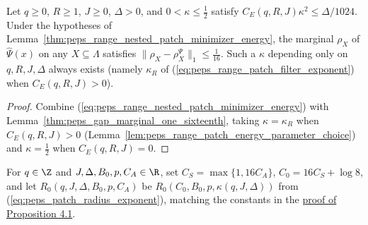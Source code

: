 \begin{lemma}
    \label{thm:peps_range_nested_patch_minimizer_marginal_closeness}
    \leanok
    Let $q\ge0$, $R\ge1$, $J\ge0$, $\Delta>0$, and $0<\kappa\le\tfrac12$ satisfy $C_E(q,R,J)\kappa^2\le\Delta/1024$. Under the hypotheses of Lemma~\ref{thm:peps_range_nested_patch_minimizer_energy}, the marginal $\rho_X$ of $\widehat\Psi(x)$ on any $X\subseteq\Lambda$ satisfies
    $\|\rho_X-\rho_X^{\Psi}\|_1\le\tfrac1{16}$. Such a $\kappa$ depending only on $q,R,J,\Delta$ always exists (namely $\kappa_R$ of (\ref{eq:peps_range_patch_filter_exponent}) when $C_E(q,R,J)>0$).
\end{lemma}
\begin{proof}
    \leanok
    Combine (\ref{eq:peps_range_nested_patch_minimizer_energy}) with Lemma~\ref{thm:peps_gap_marginal_one_sixteenth}, taking $\kappa=\kappa_R$ when $C_E(q,R,J)>0$ (Lemma~\ref{lem:peps_range_patch_energy_parameter_choice}) and $\kappa=\tfrac12$ when $C_E(q,R,J)=0$.
\end{proof}

\begin{definition}
    \label{def:peps_nested_patch_radius_exponent}
    \leanok
    For $q\in\Z$ and $J,\Delta,B_0,p,C_A\in\R$, set
    $C_S=\max\{1,16C_A\}$, $C_0=16C_S+\log8$, and let
    $R_0(q,J,\Delta,B_0,p,C_A)$ be $R_0(C_0,B_0,p,\kappa(q,J,\Delta))$ from
    (\ref{eq:peps_patch_radius_exponent}), matching the constants in the
    \href{https://github.com/openai/math/blob/adc7f1241b42e322a6451854ab7e4b4c146bf78a/preprints/Polynomial-PEPS-approximation-of-gapped-square-grid-ground-states-September-24-2026/build/sections/03-patches.tex\#L362-L411}{proof of Proposition 4.1}.
\end{definition}


